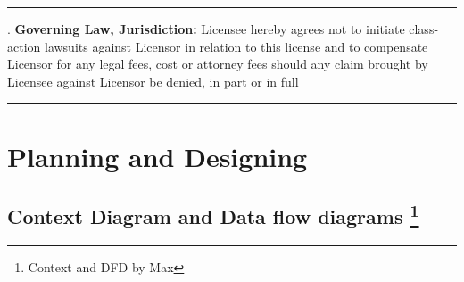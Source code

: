 \documentclass[oneside,openany,11pt,a4paper]{report}
\begin{document}
\noindent\rule{\textwidth}{0.5pt}
. \textbf{Governing Law, Jurisdiction:} Licensee hereby agrees not to initiate class-action lawsuits against Licensor in relation to this license and to compensate Licensor for any legal fees, cost or attorney fees should any claim brought by Licensee against Licensor be denied, in part or in full
\noindent\rule{\textwidth}{0.5pt}

\normalfont

\chapter{Planning and Designing}
\section[Context Data flow diagrams]{Context Diagram and Data flow diagrams \protect\footnote{Context and DFD by Max}}
\centering
\end{document}
